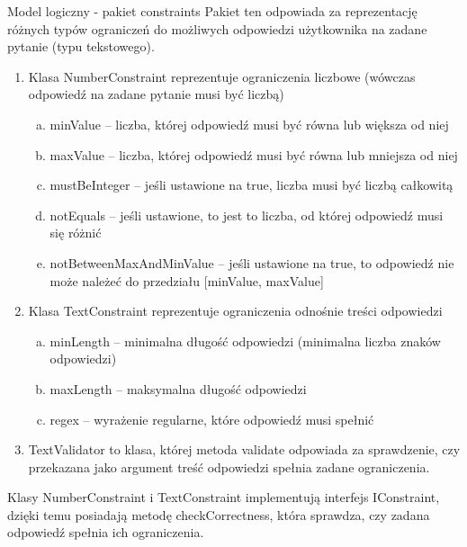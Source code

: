 \documentclass[a4paper,10pt]{beamer}
\begin{document}
	\begin{frame}{Model logiczny - pakiet constraints}
		Pakiet ten odpowiada za reprezentację różnych typów ograniczeń do możliwych odpowiedzi użytkownika na zadane pytanie (typu tekstowego).
		\begin{enumerate}[1)]
				\item	Klasa NumberConstraint reprezentuje ograniczenia liczbowe (wówczas odpowiedź na zadane pytanie musi być liczbą)
				\begin{enumerate}[a)]
					\item	minValue – liczba, której odpowiedź musi być równa lub większa od niej
					\item	maxValue – liczba, której odpowiedź musi być równa lub mniejsza od niej
					\item	mustBeInteger – jeśli ustawione na true, liczba musi być liczbą całkowitą
					\item	notEquals – jeśli ustawione, to jest to liczba, od której odpowiedź musi się różnić
					\item	notBetweenMaxAndMinValue – jeśli ustawione na true, to odpowiedź nie może należeć do przedziału [minValue, maxValue]
				\end{enumerate}
			\end{enumerate}
		\end{frame}
		\begin{frame}
			\begin{enumerate}[1)]
				\setcounter{enumi}{1}
				\item	Klasa TextConstraint reprezentuje ograniczenia odnośnie treści odpowiedzi
				\begin{enumerate}[a)]
					\item	minLength – minimalna długość odpowiedzi (minimalna liczba znaków odpowiedzi)
					\item	maxLength – maksymalna długość odpowiedzi
					\item	regex – wyrażenie regularne, które odpowiedź musi spełnić	
				\end{enumerate}
				
				\item	TextValidator to klasa, której metoda validate odpowiada za sprawdzenie, czy przekazana jako argument treść odpowiedzi spełnia zadane ograniczenia.	
		\end{enumerate}
	
		Klasy NumberConstraint i TextConstraint implementują interfejs IConstraint, dzięki temu posiadają metodę checkCorrectness, która sprawdza, czy zadana odpowiedź spełnia ich ograniczenia.
	\end{frame}
\end{document}
